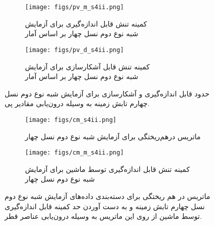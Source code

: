   	\begin{figure}
  		\centering
  		\begin{subfigure}{0.5\textwidth}
  			\centering
  			\texttt{[image: figs/pv\_m\_s4ii.png]}
  			\caption{   کمینه تنش قابل اندازه‌گیری برای آزمایش
  				\\	 شبه نوع دوم نسل چهار
  				بر اساس آمار }
  		\end{subfigure}%
  		\begin{subfigure}{0.5\textwidth}
  			\centering
  			\texttt{[image: figs/pv\_d\_s4ii.png]}
  			\caption{  کمینه تنش قابل آشکارسازی برای آزمایش 
  				\\ شبه نوع دوم نسل چهار
  				بر اساس آمار  }
  		\end{subfigure}
  		
  		\caption{حدود قابل اندازه‌گیری و آشکارسازی برای آزمایش شبه نوع دوم نسل چهارم تابش زمینه
  			به وسیله درون‌یابی مقادیر پی.}
  		\label{fig:s4ii_pv}
  	\end{figure}
  	\begin{figure}
  		\centering
  		\begin{subfigure}{\textwidth}
  			\centering
  			\texttt{[image: figs/cm\_s4ii.png]}
  			\caption{  ماتریس درهم‌ریختگی برای  
  			آزمایش شبه نوع دوم نسل چهار}
  		\end{subfigure}%
  		
  		\begin{subfigure}{0.5\linewidth}
  			\centering
  			\texttt{[image: figs/cm\_m\_s4ii.png]}
  			\caption{  کمینه تنش قابل اندازه‌گیری توسط ماشین برای آزمایش شبه نوع دوم نسل چهار}
  		\end{subfigure}
  		
  		\caption{ماتریس در هم ریختگی برای دسته‌بندی داده‌های آزمایش شبه نوع دوم نسل چهارم تابش زمینه
  			و به دست آوردن حد کمینه قابل اندازه‌گیری توسط ماشین از روی این ماتریس به وسیله درون‌یابی عناصر قطر.}
  		\label{fig:s4ii_cm}
  	\end{figure}
  	
  	
  	
